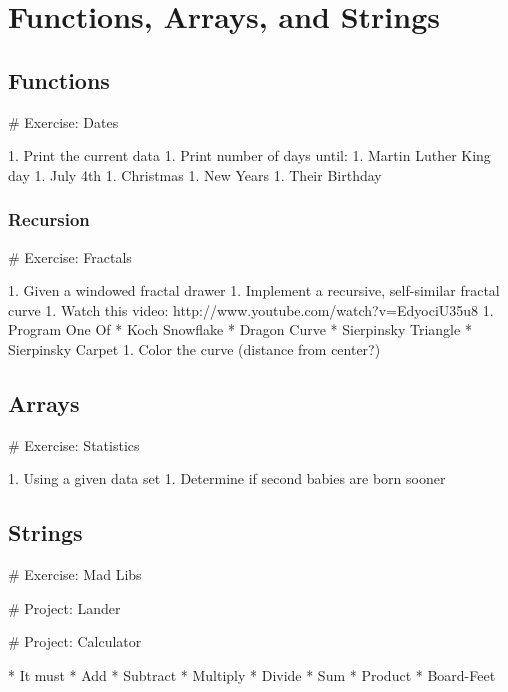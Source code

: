 \chapter{Functions, Arrays, and Strings}

\section{Functions}

# Exercise: Dates

1. Print the current data
1. Print number of days until:
  1. Martin Luther King day
  1. July 4th
  1. Christmas
  1. New Years
  1. Their Birthday

\subsection{Recursion}

# Exercise: Fractals

1. Given a windowed fractal drawer
1. Implement a recursive, self-similar fractal curve
  1. Watch this video: http://www.youtube.com/watch?v=EdyociU35u8
  1. Program One Of
    * Koch Snowflake
    * Dragon Curve
    * Sierpinsky Triangle
    * Sierpinsky Carpet
  1. Color the curve (distance from center?)

\section{Arrays}

# Exercise: Statistics

1. Using a given data set
1. Determine if second babies are born sooner

\section{Strings}

# Exercise: Mad Libs

# Project: Lander

# Project: Calculator

* It must
  * Add
  * Subtract
  * Multiply
  * Divide
  * Sum
  * Product
  * Board-Feet


